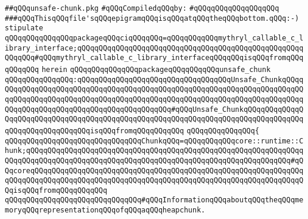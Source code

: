 \label{src/lib/std/src/unsafe/unsafe-chunk.pkg}
\verb|##qQQqunsafe-chunk.pkg|\newline
\newline
\verb|#qQQqCompiledqQQqby:|\newline
\verb|#qQQqqQQqqQQqqQQqqQQq|\newline
\newline
\verb|###qQQqThisqQQqfile'sqQQqepigramqQQqisqQQqatqQQqtheqQQqbottom.qQQq:-)|\newline
\newline
\newline
\verb|stipulate|\newline
\verb|qQQqqQQqqQQqqQQqpackageqQQqciqQQqqQQq=qQQqqQQqqQQqmythryl_callable_c_library_interface;qQQqqQQqqQQqqQQqqQQqqQQqqQQqqQQqqQQqqQQqqQQqqQQqqQQqqQQqqQQq#qQQqmythryl_callable_c_library_interfaceqQQqqQQqisqQQqfromqQQqqQQqqQQq|\newline
\verb|herein|\newline
\newline
\verb|qQQqqQQqqQQqqQQqpackageqQQqqQQqqQQqunsafe_chunk|\newline
\verb|qQQqqQQqqQQqqQQq:qQQqqQQqqQQqqQQqqQQqqQQqqQQqqQQqqQQqUnsafe_ChunkqQQqqQQqqQQqqQQqqQQqqQQqqQQqqQQqqQQqqQQqqQQqqQQqqQQqqQQqqQQqqQQqqQQqqQQqqQQqqQQqqQQqqQQqqQQqqQQqqQQqqQQqqQQqqQQqqQQqqQQqqQQqqQQqqQQqqQQqqQQqqQQqqQQqqQQqqQQqqQQqqQQqqQQqqQQqqQQqqQQqqQQq#qQQqUnsafe_ChunkqQQqqQQqqQQqqQQqqQQqqQQqqQQqqQQqqQQqqQQqqQQqqQQqqQQqqQQqqQQqqQQqqQQqqQQqqQQqqQQqqQQqqQQqqQQqqQQqqQQqqQQqisqQQqfromqQQqqQQqqQQq|\newline
\verb|qQQqqQQqqQQqqQQq{|\newline
\verb|qQQqqQQqqQQqqQQqqQQqqQQqqQQqqQQqChunkqQQq=qQQqqQQqqQQqcore::runtime::Chunk;qQQqqQQqqQQqqQQqqQQqqQQqqQQqqQQqqQQqqQQqqQQqqQQqqQQqqQQqqQQqqQQqqQQqqQQqqQQqqQQqqQQqqQQqqQQqqQQqqQQqqQQqqQQqqQQqqQQqqQQqqQQqqQQqqQQq#qQQqcoreqQQqqQQqqQQqqQQqqQQqqQQqqQQqqQQqqQQqqQQqqQQqqQQqqQQqqQQqqQQqqQQqqQQqqQQqqQQqqQQqqQQqqQQqqQQqqQQqqQQqqQQqqQQqqQQqqQQqqQQqqQQqqQQqqQQqqQQqisqQQqfromqQQqqQQqqQQq|\newline
\newline
\verb|qQQqqQQqqQQqqQQqqQQqqQQqqQQqqQQq#qQQqInformationqQQqaboutqQQqtheqQQqmemoryqQQqrepresentationqQQqofqQQqaqQQqheapchunk.|\newline
